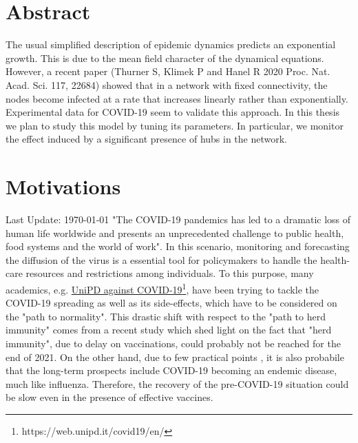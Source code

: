 \documentclass[a4paper,12pt,twoside]{book} %
\theoremstyle{definition}
\begin{document}

\fancyhf{}
\pagestyle{fancy}




\chapter*{Abstract}
The usual simplified description of epidemic dynamics predicts an exponential growth. This is due to the mean field character of the dynamical equations. However, a recent paper (Thurner S, Klimek P and Hanel R 2020 Proc. Nat. Acad. Sci. 117, 22684) \cite{Thurner::NetBasedExpl} showed
that in a network with fixed connectivity, the nodes become infected at a rate that increases linearly rather than exponentially.
Experimental data for COVID-19 seem to validate this approach. In this thesis we plan to study this model by tuning its parameters.
In particular, we monitor the effect induced by a significant presence of hubs in the network.

\chapter*{Motivations}
Last Update: \today
"The COVID-19 pandemics has led to a dramatic loss of human life worldwide and presents an unprecedented challenge to public health, food systems and the world of work"\cite{Chriscaden::2021_ImpactCOVID19}. In this scenario, monitoring and forecasting the diffusion of the virus is a essential tool for policymakers to handle the health-care resources and restrictions among individuals. To this purpose, many academics, e.g. \href{https://web.unipd.it/covid19/en/}{UniPD against COVID-19}\footnote{https://web.unipd.it/covid19/en/}, have been trying to tackle the COVID-19 spreading as well as its side-effects, which have to be considered on the "path to normality". This drastic shift with respect to the "path to herd immunity" comes from a recent study \cite{GU::2021_SitePathToNormality} which shed light on the fact that "herd immunity", due to delay on vaccinations, could probably not be reached for the end of 2021. On the other hand, due to few practical points \cite{Nature:18.3.2021_NoHerdImmunity}, it is also probabile that the long-term prospects include COVID-19 becoming an endemic disease, much like influenza. 
Therefore, the recovery of the pre-COVID-19 situation could be slow even in the presence of effective vaccines.
\end{document}
